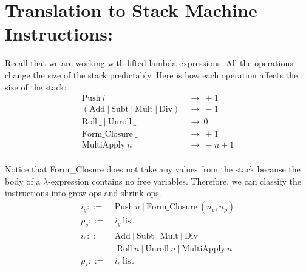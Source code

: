\documentclass[11pt]{article}
\begin{document}
\iffalse{Now we will discuss the non-injective functions and the approach to maintaining the history tape. When reversing an $\text{Add}$ instruction (or in general an arithmetic binary operation), one cannot uniquely determine two integers whose sum is is the integer at the top of the stack, therefore, when adding $\text{Int}\ n_1$ and $\text{Int}\ n_2$, we place $n_1$ onto the history since the function $(+)\ n_1$ is injective. This is the case for the other binary operations, and for Div,
the two integers must divide evenly.

Likewise, when reversing an $\text{MultiApply}\ n$ operation, one cannnot uniquely determine which instructions belong in the closure and which stack values are used in the closure, therefore to restore $\text{Closure} (n, \hat{\sigma})$, we must add the lengths of $\hat{\sigma}$ to the history tape upon executing an $\text{MultiApply}\ n$ instruction.
}
\fi

\section*{Translation to Stack Machine Instructions:}

Recall that we are working with lifted lambda expressions. All the operations change the size of the stack predictably. Here is how each operation affects the size of the stack:
\begin{align*}
    \text {Push}\ i\ &\rightarrow\ +1\\
    (\text{Add}\ |\ \text{Subt}\ |\ \text{Mult}\ |\ \text{Div})\ &\rightarrow\ -1\\
    \text{Roll}\ \_\ |\ \text{Unroll}\ \_ \ &\rightarrow\ 0\\
    \text {Form\_Closure}\ \_\ &\rightarrow\ +1\\
    \text {MultiApply}\ n\ &\rightarrow\ -n + 1\\
\end{align*}

Notice that Form\_Closure does not take any values from the stack because the body of a $\lambda$-expression contains no free variables. 
Therefore, we can classify the instructions into grow ops and shrink ops.
\begin{align*}
    i_g ::=&\ \text{Push}\ n\ |\ \text{Form\_Closure}\ (n_v, n_{\rho})\\
    \rho_g ::=&\ i_g\ \text{list}\\
    i_s ::=&\ \text {Add}\ |\ \text {Subt}\ |\ \text {Mult}\ |\ \text {Div}\\
    & |\ \text{Roll}\ n\ |\ \text {Unroll}\ n\ |\ \text{MultiApply}\ n\\
    \rho_s ::=&\ i_s\ \text{list}
\end{align*}
\end{document}
